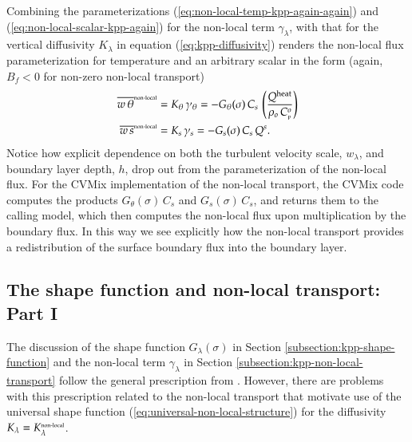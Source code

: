 Combining the parameterizations
(\ref{eq:non-local-temp-kpp-again-again}) and
(\ref{eq:non-local-scalar-kpp-again}) for the non-local term
$\gamma_{\lambda}$, with that for the vertical diffusivity
$K_{\lambda}$ in equation (\ref{eq:kpp-diffusivity}) renders the
non-local flux parameterization for temperature and an arbitrary
scalar in the form (again, $B_{f} < 0$ for non-zero non-local
transport)
\begin{subequations}
\begin{align}
\overline{w \, \theta}^{\mbox{\tiny non-local}} &= K_{\theta}  \, \gamma_{\theta}
  = 
 - G_{\theta}(\sigma) \, C_{s} \, \left( \frac{ Q^{\mbox{\scriptsize heat}}}{ \rho_{o}  \, C_{\mbox{\tiny p}}^{o} } \right)
\label{eq:non-local-flux-kpp-param-temp-again}
\\
\overline{w \, s}^{\mbox{\tiny non-local}} &= K_{s}  \, \gamma_{s}
  = 
 -G_{s}(\sigma) \, C_{s} \,  Q^{s}.
\label{eq:non-local-flux-kpp-param-scalar-again}
\end{align}
\end{subequations}
Notice how explicit dependence on both the turbulent velocity scale,
$w_{\lambda}$, and boundary layer depth, $h$, drop out from the
parameterization of the non-local flux.  For the CVMix implementation
of the non-local transport, the CVMix code computes the products
$G_{\theta}(\sigma) \, C_{s}$ and $G_{s}(\sigma) \, C_{s}$, and
returns them to the calling model, which then computes the non-local
flux upon multiplication by the boundary flux.  In this way we see
explicitly how the non-local transport provides a redistribution of
the surface boundary flux into the boundary layer.


\subsection{The shape function and non-local transport: Part I}
\label{subsection:kpp-shape-function-cvmix}

The discussion of the shape function $G_{\lambda}(\sigma)$ in Section
\ref{subsection:kpp-shape-function} and the non-local term
$\gamma_{\lambda}$ in Section \ref{subsection:kpp-non-local-transport}
follow the general prescription from \cite{LargeKPP}.  However, there
are problems with this prescription related to the non-local transport
that motivate use of the universal shape function
(\ref{eq:universal-non-local-structure}) for the diffusivity
$K_{\lambda} = K^{\mbox{\tiny non-local}}_{\lambda}$.



